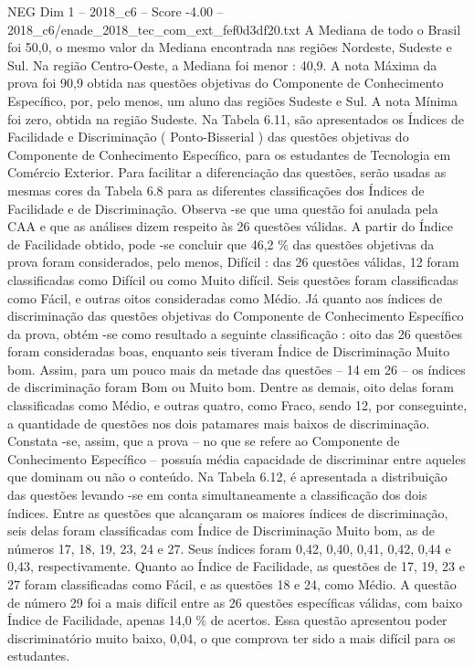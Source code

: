 \begin{textsample}{NEG Dim 1 – 2018\_c6 – Score -4.00 – 2018\_c6/enade\_2018\_tec\_com\_ext\_fef0d3df20.txt}
A Mediana de todo o Brasil foi 50,0, o mesmo valor da Mediana encontrada nas regiões Nordeste, Sudeste e Sul.
Na região Centro-Oeste, a Mediana foi menor : 40,9.
A nota Máxima da prova foi 90,9 obtida nas questões objetivas do Componente de Conhecimento Específico, por, pelo menos, um aluno das regiões Sudeste e Sul.
A nota Mínima foi zero, obtida na região Sudeste.
Na Tabela 6.11, são apresentados os Índices de Facilidade e Discriminação ( Ponto-Bisserial ) das questões objetivas do Componente de Conhecimento Específico, para os estudantes de Tecnologia em Comércio Exterior.
Para facilitar a diferenciação das questões, serão usadas as mesmas cores da Tabela 6.8 para as diferentes classificações dos Índices de Facilidade e de Discriminação.
Observa -se que uma questão foi anulada pela CAA e que as análises dizem respeito às 26 questões válidas.
A partir do Índice de Facilidade obtido, pode -se concluir que 46,2 \% das questões objetivas da prova foram considerados, pelo menos, Difícil : das 26 questões válidas, 12 foram classificadas como Difícil ou como Muito difícil.
Seis questões foram classificadas como Fácil, e outras oitos consideradas como Médio.
Já quanto aos índices de discriminação das questões objetivas do Componente de Conhecimento Específico da prova, obtém -se como resultado a seguinte classificação : oito das 26 questões foram consideradas boas, enquanto seis tiveram Índice de Discriminação Muito bom.
Assim, para um pouco mais da metade das questões – 14 em 26 – os índices de discriminação foram Bom ou Muito bom.
Dentre as demais, oito delas foram classificadas como Médio, e outras quatro, como Fraco, sendo 12, por conseguinte, a quantidade de questões nos dois patamares mais baixos de discriminação.
Constata -se, assim, que a prova – no que se refere ao Componente de Conhecimento Específico – possuía média capacidade de discriminar entre aqueles que dominam ou não o conteúdo.
Na Tabela 6.12, é apresentada a distribuição das questões levando -se em conta simultaneamente a classificação dos dois índices.
Entre as questões que alcançaram os maiores índices de discriminação, seis delas foram classificadas com Índice de Discriminação Muito bom, as de números 17, 18, 19, 23, 24 e 27.
Seus índices foram 0,42, 0,40, 0,41, 0,42, 0,44 e 0,43, respectivamente.
Quanto ao Índice de Facilidade, as questões de 17, 19, 23 e 27 foram classificadas como Fácil, e as questões 18 e 24, como Médio.
A questão de número 29 foi a mais difícil entre as 26 questões específicas válidas, com baixo Índice de Facilidade, apenas 14,0 \% de acertos.
Essa questão apresentou poder discriminatório muito baixo, 0,04, o que comprova ter sido a mais difícil para os estudantes.

\end{textsample}
